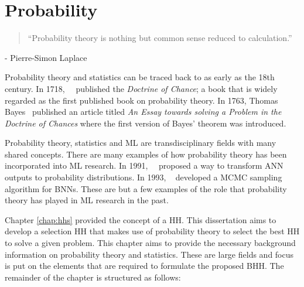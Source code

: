 \chapter{Probability}
\label{chap:probability}

\begin{quotation}
      ``Probability theory is nothing but common sense reduced to calculation.''
\end{quotation}
\begin{flushright}
      - Pierre-Simon Laplace
\end{flushright}

Probability theory and statistics can be traced back to as early as the 18th century. In 1718,~\citeauthor{ref:demoivre:1718}~\cite{ref:demoivre:1718} published the \textit{Doctrine of Chance}; a book that is widely regarded as the first published book on probability theory. In 1763, Thomas Bayes~\cite{ref:bayes:1763} published an article titled \textit{An Essay towards solving a Problem in the Doctrine of Chances} where the first version of Bayes' theorem was introduced.

Probability theory, statistics and \acf{ML} are transdisciplinary fields with many shared concepts. There are many examples of how probability theory has been incorporated into \acs{ML} research. In 1991,~\citeauthor{ref:denker:1991}~\cite{ref:denker:1991} proposed a way to transform \acf{ANN} outputs to probability distributions. In 1993, \citeauthor{ref:neal:1993}~\cite{ref:neal:1993} developed a \acf{MCMC} sampling algorithm for \acfp{BNN}. These are but a few examples of the role that probability theory has played in \acs{ML} research in the past.

Chapter \ref{chap:hhs} provided the concept of a \acf{HH}. This dissertation aims to develop a selection \acs{HH} that makes use of probability theory to select the best \acs{HH} to solve a given problem. This chapter aims to provide the necessary background information on probability theory and statistics. These are large fields and focus is put on the elements that are required to formulate the proposed \acf{BHH}. The remainder of the chapter is structured as follows:

